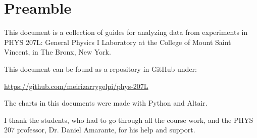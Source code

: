 \chapter{Preamble}
This document is a collection of guides for analyzing data from experiments in PHYS 207L: General Physics I Laboratory at the College of Mount Saint Vincent, in The Bronx, New York.

This document can be found as a repository in GitHub under:
\begin{center}
    \url{https://github.com/meirizarrygelpi/phys-207L}
\end{center}
The charts in this documents were made with Python and Altair.

I thank the students, who had to go through all the course work, and the PHYS 207 professor, Dr. Daniel Amarante, for his help and support.